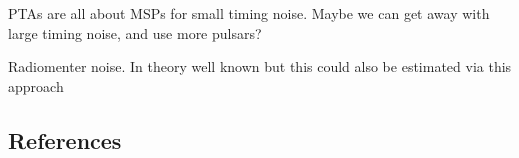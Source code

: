 \documentclass[fleqn,usenatbib,useAMS]{mnras}
\begin{document}
PTAs are all about MSPs for small timing noise. Maybe we can get away with large timing noise, and use more pulsars?


Radiomenter noise. In theory well known but this could also be estimated via this approach 










\subsection{References}
\label{sec:ref_list}













\bsp	%
\label{lastpage}
\end{document}
